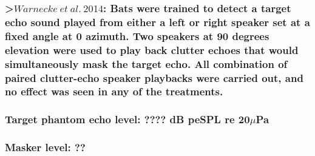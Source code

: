 \documentclass[11pt]{article}
\begin{document}
\hypertarget{warnecke-et-al.-2014-bats-were-trained-to-detect-a-target-echo-sound-played-from-either-a-left-or-right-speaker-set-at-a-fixed-angle-at-0-azimuth.-two-speakers-at-90-degrees-elevation-were-used-to-play-back-clutter-echoes-that-would-simultaneously-mask-the-target-echo.-all-combination-of-paired-clutter-echo-speaker-playbacks-were-carried-out-and-no-effect-was-seen-in-any-of-the-treatments.}{%
\subsubsection{\texorpdfstring{\textgreater{}\href{http://asa.scitation.org/doi/abs/10.1121/1.4869483}{\(Warnecke\ et\ al.\ 2014\)}:
Bats were trained to detect a target echo sound played from either a
left or right speaker set at a fixed angle at 0 azimuth. Two speakers at
90 degrees elevation were used to play back clutter echoes that would
simultaneously mask the target echo. All combination of paired
clutter-echo speaker playbacks were carried out, and no effect was seen
in any of the
treatments.}{\textgreater{}Warnecke\textbackslash{} et\textbackslash{} al.\textbackslash{} 2014: Bats were trained to detect a target echo sound played from either a left or right speaker set at a fixed angle at 0 azimuth. Two speakers at 90 degrees elevation were used to play back clutter echoes that would simultaneously mask the target echo. All combination of paired clutter-echo speaker playbacks were carried out, and no effect was seen in any of the treatments.}}\label{warnecke-et-al.-2014-bats-were-trained-to-detect-a-target-echo-sound-played-from-either-a-left-or-right-speaker-set-at-a-fixed-angle-at-0-azimuth.-two-speakers-at-90-degrees-elevation-were-used-to-play-back-clutter-echoes-that-would-simultaneously-mask-the-target-echo.-all-combination-of-paired-clutter-echo-speaker-playbacks-were-carried-out-and-no-effect-was-seen-in-any-of-the-treatments.}}

\hypertarget{target-phantom-echo-level-db-pespl-re-20mupa}{%
\subsubsection{\texorpdfstring{Target phantom echo level: ???? dB peSPL
re
20\(\mu\)Pa}{Target phantom echo level: ???? dB peSPL re 20\textbackslash{}muPa}}\label{target-phantom-echo-level-db-pespl-re-20mupa}}

\hypertarget{masker-level}{%
\subsubsection{Masker level: ??}\label{masker-level}}
\end{document}

